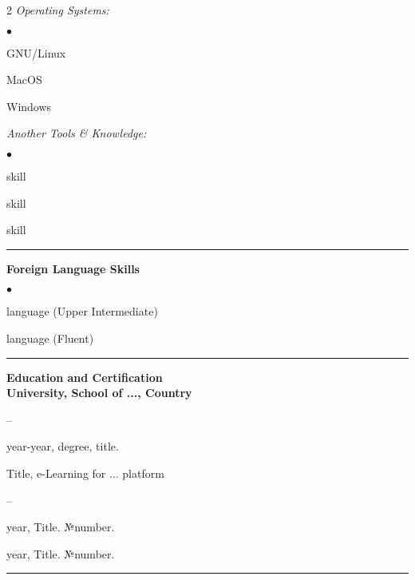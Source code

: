 \documentclass[oneside,final,10pt]{extreport}
\newenvironment{compactlist}{
	\begin{list}{{$\bullet$}}{
		\setlength\leftmargin{0.4cm}
		\setlength\partopsep{0pt}
		\setlength\parskip{0pt}
		\setlength\parsep{0pt}
		\setlength\topsep{0pt}
		\setlength\itemsep{0pt}
	}
}{
	\end{list}
}
\newenvironment{innerlist}{
	\begin{list}{--}{
		\setlength\leftmargin{0.8cm}
		\setlength\partopsep{0pt}
		\setlength\parskip{0pt}
		\setlength\parsep{0pt}
		\setlength\topsep{0pt}
		\setlength\itemsep{0pt}
	}
}{
	\end{list}
}
\begin{document}
	\begin{multicols}{2}
		\textsl{Operating Systems:}
			\begin{compactlist}
				\item GNU/Linux
				\item MacOS
				\item Windows
			\end{compactlist}
		\textsl{Another Tools \& Knowledge:}
			\begin{compactlist}
				\item skill
				\item skill
				\item skill
			\end{compactlist}
	\end{multicols}
\rule{\textwidth}{0.4pt}

\bfseries
Foreign Language Skills
\mdseries
	\begin{compactlist}
		\item language (Upper Intermediate)
		\item language (Fluent)
	\end{compactlist}
\rule{\textwidth}{0.4pt}

\bfseries
Education and Certification
\mdseries \\[3pt]	
University, School of ..., Country  	
	\begin{innerlist}	
		\item year-year, degree, title. 
	\end{innerlist}	
Title, e-Learning for ... platform 
	\begin{innerlist}	
		\item year, Title. №number.
		\item year, Title. №number.
	\end{innerlist}	 
\rule{\textwidth}{0.4pt}
\end{document}
